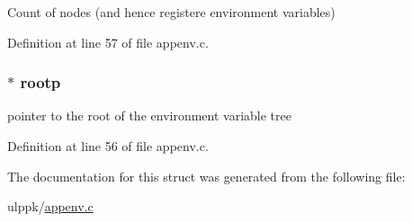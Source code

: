 Count of nodes (and hence registere environment variables) 



Definition at line 57 of file appenv.\-c.

\hypertarget{struct_e_n_v___t_r_e_e_a8311200b56298533a3c4a61081207326}{
\subsubsection[{rootp}]{$\ast$ rootp}}\label{struct_e_n_v___t_r_e_e_a8311200b56298533a3c4a61081207326}


pointer to the root of the environment variable tree 



Definition at line 56 of file appenv.\-c.



The documentation for this struct was generated from the following file\-:\begin{DoxyCompactItemize}
\item 
ulppk/\hyperlink{appenv_8c}{appenv.\-c}\end{DoxyCompactItemize}
